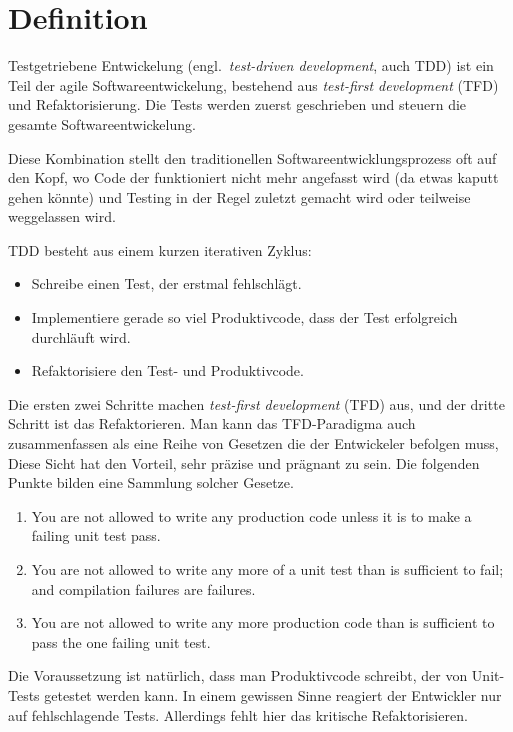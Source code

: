 \documentclass{mitschrift}
\newcommand{\bmn}{\marginpar{Benjamin\\Morgan}}
\begin{document}
\chapter{Definition}\label{Definition}\bmn
Testgetriebene Entwickelung (engl.\ \emph{test-driven development}, auch TDD)
ist ein Teil der agile Softwareentwickelung, bestehend aus \emph{test-first
development} (TFD) und Refaktorisierung. Die Tests werden zuerst geschrieben und
steuern die gesamte Softwareentwickelung. \cite{AgileData, itAgile}

Diese Kombination stellt den traditionellen Softwareentwicklungsprozess oft auf
den Kopf, wo Code der funktioniert nicht mehr angefasst wird (da etwas kaputt
gehen könnte) und Testing in der Regel zuletzt gemacht wird oder teilweise
weggelassen wird.

TDD besteht aus einem kurzen iterativen Zyklus:

\begin{itemize}
    \item Schreibe einen Test, der erstmal fehlschlägt.
    \item Implementiere gerade so viel Produktivcode, dass der Test erfolgreich
        durchläuft wird.
    \item Refaktorisiere den Test- und Produktivcode. \cite{itAgile}
\end{itemize}

Die ersten zwei Schritte machen \emph{test-first development} (TFD) aus, und
der dritte Schritt ist das Refaktorieren.  Man kann das TFD-Paradigma auch
zusammenfassen als eine Reihe von Gesetzen die der Entwickeler befolgen muss,
Diese Sicht hat den Vorteil, sehr präzise und prägnant zu sein.
Die folgenden Punkte bilden eine Sammlung solcher Gesetze.

\begin{enumerate}
    \item You are not allowed to write any production code unless it is to make
        a failing unit test pass.
    \item You are not allowed to write any more of a unit test than is
        sufficient to fail; and compilation failures are failures.
    \item You are not allowed to write any more production code than is
        sufficient to pass the one failing unit test. \cite{UncleBob}
\end{enumerate}

Die Voraussetzung ist natürlich, dass man Produktivcode schreibt, der von
Unit-Tests getestet werden kann. In einem gewissen Sinne reagiert der
Entwickler nur auf fehlschlagende Tests. Allerdings fehlt hier das kritische
Refaktorisieren.
\end{document}
